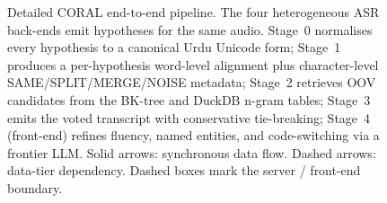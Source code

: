 \begin{figure}[htbp]
{}
    \caption[CORAL detailed end-to-end pipeline]{Detailed CORAL end-to-end pipeline. The four heterogeneous ASR back-ends emit hypotheses for the same audio. Stage~0 normalises every hypothesis to a canonical Urdu Unicode form; Stage~1 produces a per-hypothesis word-level alignment plus character-level SAME/SPLIT/MERGE/NOISE metadata; Stage~2 retrieves OOV candidates from the BK-tree and DuckDB n-gram tables; Stage~3 emits the voted transcript with conservative tie-breaking; Stage~4 (front-end) refines fluency, named entities, and code-switching via a frontier LLM. Solid arrows: synchronous data flow. Dashed arrows: data-tier dependency. Dashed boxes mark the server / front-end boundary.}
    \label{fig:coral-pipeline-detailed}
\end{figure}

